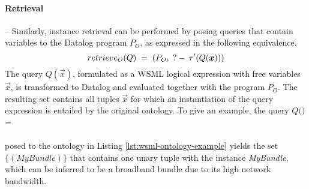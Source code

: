 \paragraph{Retrieval} -- Similarly, instance retrieval can be
performed by posing queries that contain variables to the Datalog
program $P_O$, as expressed in the following equivalence.
\begin{displaymath}
   retrieve_O(Q) \; = \; (P_O, \qury \tau'(Q(\vec{x})))
\end{displaymath}
The query $Q(\vec{x})$, formulated as a WSML logical expression
with free variables $\vec{x}$, is transformed to Datalog and
evaluated together with the program $P_O$. The resulting set
contains all tuples $\vec{x}$ for which an instantiation of the
query expression is entailed by the original ontology.
To give an example, the query $Q($$)$ = \\
\phantom{mmmmm}   \\
posed to the ontology in Listing \ref{lst:wsml-ontology-example}
yields the set $\{ (\textit{MyBundle}) \}$ that contains one unary
tuple with the instance \textit{MyBundle}, which can be inferred
to be a broadband bundle due to its high network bandwidth.

%
